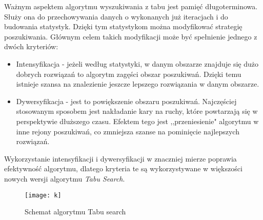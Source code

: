 Ważnym aspektem algorytmu wyszukiwania z tabu jest pamięć długoterminowa. Służy ona do przechowywania danych o wykonanych już iteracjach i do budowania statystyk. Dzięki tym statystykom można modyfikować strategię poszukiwania. Głównym celem takich modyfikacji może być spełnienie jednego z dwóch kryteriów:
\begin{itemize}
	\item Intensyfikacja - jeżeli według statystyki, w danym obszarze znajduje się dużo dobrych rozwiązań to algorytm zagęści obszar poszukiwań. Dzięki temu istnieje szansa na znalezienie jeszcze lepszego rozwiązania w danym obszarze.
	\item Dywersyfikacja - jest to powiększenie obszaru poszukiwań. Najczęściej stosowanym sposobem jest nakładanie kary na ruchy, które powtarzają się w perspektywie dłuższego czasu. Efektem tego jest ,,przeniesienie" algorytmu w inne rejony poszukiwań, co zmniejsza szanse na pominięcie najlepszych rozwiązań.
\end{itemize}
Wykorzystanie intensyfikacji i dywersyfikacji w znaczniej mierze poprawia efektywność algorytmu, dlatego kryteria te są wykorzystywane w większości nowych wersji algorytmu \textit{Tabu Search}.


\begin{figure}
\centering
\texttt{[image: k]}
\caption{Schemat algorytmu Tabu search}
\label{fig: AlgorytmTabu}
\end{figure}
